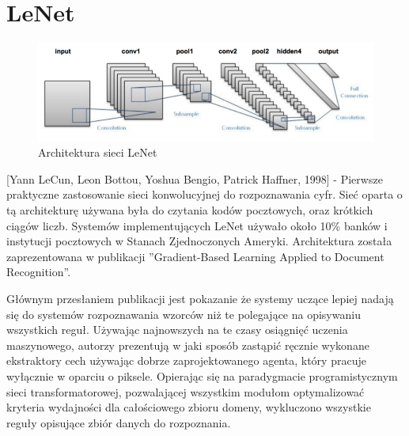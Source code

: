 \documentclass[12pt,a4paper,twoside,titlepage,openright]{book}
\begin{document}

\section{LeNet}
\begin{figure}[ht]
	\centering
			\includegraphics[resolution=100, scale=0.6]{LeNet.png}
		\caption{Architektura sieci LeNet}
\end{figure}

[Yann LeCun, Leon Bottou, Yoshua Bengio, Patrick Haffner, 1998] - Pierwsze praktyczne zastosowanie sieci konwolucyjnej do rozpoznawania cyfr. Sieć oparta o tą architekturę używana była do czytania kodów pocztowych, oraz krótkich ciągów liczb. Systemów implementujących LeNet używało około 10\% banków i instytucji pocztowych w Stanach Zjednoczonych Ameryki. Architektura została zaprezentowana w publikacji ''Gradient-Based Learning Applied to Document Recognition''.

Głównym przesłaniem publikacji jest pokazanie że systemy uczące lepiej nadają się do systemów rozpoznawania wzorców niż te polegające na opisywaniu wszystkich reguł. Używając najnowszych na te czasy osiągnięć uczenia maszynowego, autorzy prezentują w jaki sposób zastąpić ręcznie wykonane ekstraktory cech używając dobrze zaprojektowanego agenta, który pracuje wyłącznie w oparciu o piksele. Opierając się na paradygmacie programistycznym sieci transformatorowej, pozwalającej wszystkim modułom optymalizować kryteria wydajności dla całościowego zbioru domeny, wykluczono wszystkie reguły opisujące zbiór danych do rozpoznania.
\end{document}

